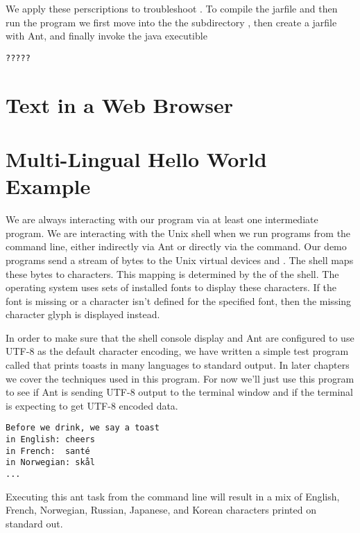 We apply these perscriptions to troubleshoot .
To compile the jarfile and then run the program
we first move into the
the subdirectory ,
then create a jarfile with Ant,
and finally invoke the java executible
%
%
\begin{verbatim} 
?????
\end{verbatim}
%




\section{Text in a Web Browser}


\section{Multi-Lingual Hello World Example}\label{section:ant-console-config-utf8}

We are always interacting with our program via at least one intermediate program.
We are interacting with the Unix shell when we run programs from the command line,
either indirectly via Ant or directly via the  command.
Our demo programs send a stream of bytes to the Unix virtual devices
 and . 
The shell maps these bytes to characters.
This mapping is determined by the  of the shell.
The operating system uses sets of installed fonts to display these characters.
If the font is missing or a character isn't defined for the specified font,
then the missing character glyph is displayed instead.

In order to make sure that the shell console display and Ant are
configured to use UTF-8 as the default character encoding, we have written
a simple test program called  that prints toasts in many
languages to standard output.
In later chapters we cover the techniques used in this program.
For now we'll just use this program to see if
Ant is sending UTF-8 output to the terminal window and if the
terminal is expecting to get UTF-8 encoded data.
\begin{verbatim} 
Before we drink, we say a toast 
in English: cheers  
in French:  santé
in Norwegian: skål
...
\end{verbatim}
Executing this ant task from the command line will result in a mix of
English, French, Norwegian, Russian, Japanese, and Korean characters
printed on standard out.

